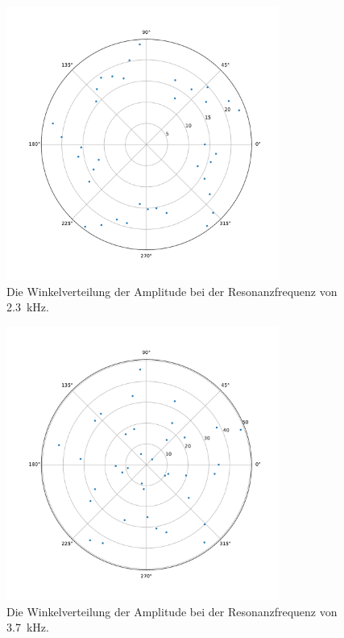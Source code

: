 \begin{figure}
    \centering
    \includegraphics[width=0.8\textwidth]{plots/C_polar1.pdf}
    \caption{Die Winkelverteilung der Amplitude bei der Resonanzfrequenz von \SI{2.3}{\kilo\hertz}.}
    \label{fig:polar23}
\end{figure}

\begin{figure}
    \centering
    \includegraphics[width=0.8\textwidth]{plots/C_polar2.pdf}
    \caption{Die Winkelverteilung der Amplitude bei der Resonanzfrequenz von \SI{3.7}{\kilo\hertz}.}
    \label{fig:polar37}
\end{figure}

